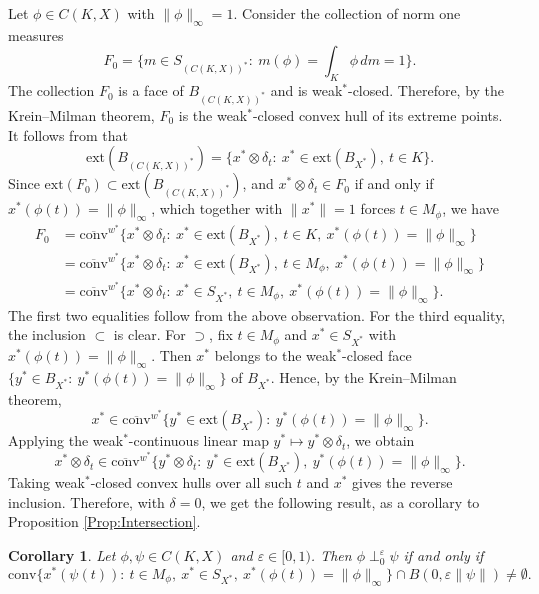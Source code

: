 \documentclass[11pt, reqno]{amsart}
\newtheorem{corollary}[theorem]{Corollary}
\theoremstyle{definition}
\begin{document}
\medskip

\noindent Let $\phi\in C(K,X)$ with $\|\phi\|_\infty=1$. Consider the collection of norm one measures
\[
F_0=\{m\in S_{(C(K,X))^*}:~m(\phi)=\int_K \phi \, dm=1\}.
\]
The collection $F_0$ is a face of $B_{(C(K,X))^*}$ and is weak$^*$-closed. Therefore, by the Krein--Milman theorem, $F_0$ is the weak$^*$-closed convex hull of its extreme points. It follows from \cite{Bro, ruess} that 
\[
\mathrm{ext}(B_{(C(K,X))^*})=\{x^*\otimes \delta_t:~x^*\in \mathrm{ext}(B_{X^*}),~t\in K\}.
\]
Since $\mathrm{ext}(F_0)\subset \mathrm{ext}(B_{(C(K,X))^*})$, and $x^*\otimes \delta_t\in F_0$ if and only if $x^*(\phi(t))=\|\phi\|_\infty$, which together with $\|x^*\|=1$ forces $t\in M_\phi$, we have
\begin{align*}
F_0 
&= \overline{\mathrm{conv}}^{w^*}\{x^*\otimes \delta_t:~x^*\in \mathrm{ext}(B_{X^*}),~t\in K,~x^*(\phi(t))=\|\phi\|_\infty\}\\
&= \overline{\mathrm{conv}}^{w^*}\{x^*\otimes \delta_t:~x^*\in \mathrm{ext}(B_{X^*}),~t\in M_\phi,~x^*(\phi(t))=\|\phi\|_\infty\}\\
&= \overline{\mathrm{conv}}^{w^*}\{x^*\otimes \delta_t:~x^*\in S_{X^*},~t\in M_\phi,~x^*(\phi(t))=\|\phi\|_\infty\}.
\end{align*}
The first two equalities follow from the above observation. For the third equality, the inclusion $\subset$ is clear. For $\supset$, fix $t\in M_\phi$ and $x^*\in S_{X^*}$ with $x^*(\phi(t))=\|\phi\|_\infty$. Then $x^*$ belongs to the weak$^*$-closed face $\{y^*\in B_{X^*}:~y^*(\phi(t))=\|\phi\|_\infty\}$ of $B_{X^*}$. Hence, by the Krein--Milman theorem,
\[
x^*\in\overline{\mathrm{conv}}^{w^*}\{y^*\in \mathrm{ext}(B_{X^*}):~y^*(\phi(t))=\|\phi\|_\infty\}.
\]
Applying the weak$^*$-continuous linear map $y^*\mapsto y^*\otimes \delta_t$, we obtain
\[
x^*\otimes \delta_t\in\overline{\mathrm{conv}}^{w^*}\{y^*\otimes \delta_t:~y^*\in \mathrm{ext}(B_{X^*}),~y^*(\phi(t))=\|\phi\|_\infty\}.
\]
Taking weak$^*$-closed convex hulls over all such $t$ and $x^*$ gives the reverse inclusion. Therefore, with $\delta=0$, we get the following result, as a corollary to Proposition \ref{Prop:Intersection}.

\begin{corollary}\label{Cor:CKX}
Let $\phi, \psi \in C(K,X)$ and $\varepsilon\in  [0,1)$. Then $\phi\perp^{\varepsilon}_0 \psi$ if and only if
\[
\mathrm{conv}\{x^*(\psi(t)):\ t\in M_\phi,\ x^*\in S_{X^*},\ x^*(\phi(t))=\|\phi\|_\infty\}
\cap B(0,\varepsilon\|\psi\|)\neq\emptyset.
\]
\end{corollary}
\end{document}
